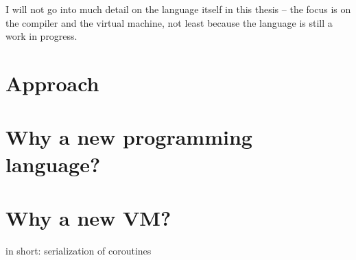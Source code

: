 	I will not go into much detail on the language itself in this thesis -- the focus is on the compiler and the virtual machine, not least because the language is still a work in progress.
    
    
	\section{Approach} %
	
	
	\section{Why a new programming language?}
	
	\section{Why a new VM?}
	
	in short: serialization of coroutines
